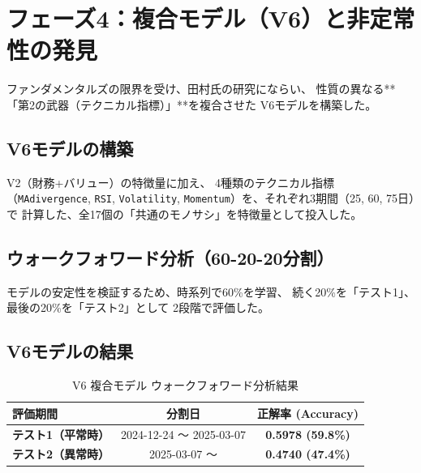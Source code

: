 \documentclass[a4paper, 11pt]{ltjsarticle}
\begin{document}
\section{フェーズ4：複合モデル（V6）と非定常性の発見}
ファンダメンタルズの限界を受け、田村氏の研究にならい、
性質の異なる**「第2の武器（テクニカル指標）」**を複合させた
V6モデルを構築した。

\subsection*{V6モデルの構築}
V2（財務+バリュー）の特徴量に加え、
4種類のテクニカル指標（\texttt{MAdivergence}, \texttt{RSI},
\texttt{Volatility}, \texttt{Momentum}）を、それぞれ3期間（25, 60, 75日）で
計算した、全17個の「共通のモノサシ」を特徴量として投入した。

\subsection*{ウォークフォワード分析（60-20-20分割）}
モデルの安定性を検証するため、時系列で60\%を学習、
続く20\%を「テスト1」、最後の20\%を「テスト2」として
2段階で評価した。

\subsection*{V6モデルの結果}
\begin{table}[h]
  \centering
  \caption{V6 複合モデル ウォークフォワード分析結果}
  \label{tab:v6_results}
  \begin{tabular}{lcc}
    \toprule
    評価期間 & 分割日 & 正解率 (Accuracy) \\
    \midrule
    \textbf{テスト1（平常時）} & 2024-12-24 〜 2025-03-07 & \textbf{0.5978 (59.8\%)} \\
    \textbf{テスト2（異常時）} & 2025-03-07 〜 & \textbf{0.4740 (47.4\%)} \\
    \bottomrule
  \end{tabular}
\end{table}
\end{document}
